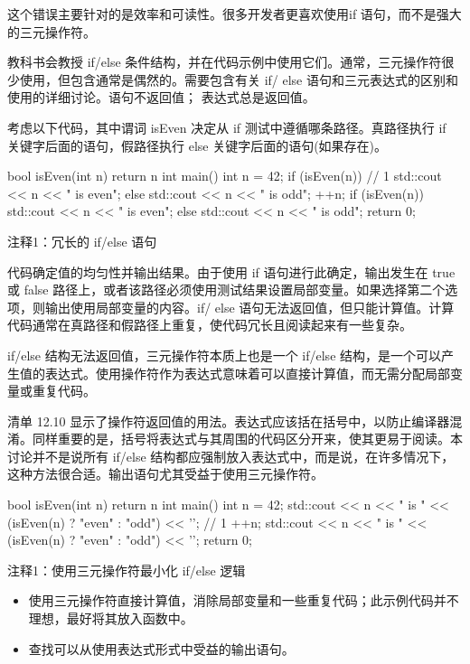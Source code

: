 这个错误主要针对的是效率和可读性。很多开发者更喜欢使用if 语句，而不是强大的三元操作符。


教科书会教授 if/else 条件结构，并在代码示例中使用它们。通常，三元操作符很少使用，但包含通常是偶然的。需要包含有关 if/ else 语句和三元表达式的区别和使用的详细讨论。语句不返回值； 表达式总是返回值。

考虑以下代码，其中谓词 isEven 决定从 if 测试中遵循哪条路径。真路径执行 if 关键字后面的语句，假路径执行 else 关键字后面的语句(如果存在)。


\begin{cpp}
bool isEven(int n) {
  return n %
}
int main() {
  int n = 42;
  if (isEven(n)) // 1
    std::cout << n << " is even\n";
  else
    std::cout << n << " is odd\n";
  ++n;
  if (isEven(n))
    std::cout << n << " is even\n";
  else
    std::cout << n << " is odd\n";
  return 0;
}
\end{cpp}

{\footnotesize
注释1：冗长的 if/else 语句
}


代码确定值的均匀性并输出结果。由于使用 if 语句进行此确定，输出发生在 true 或 false 路径上，或者该路径必须使用测试结果设置局部变量。如果选择第二个选项，则输出使用局部变量的内容。if/ else 语句无法返回值，但只能计算值。计算代码通常在真路径和假路径上重复，使代码冗长且阅读起来有一些复杂。


if/else 结构无法返回值，三元操作符本质上也是一个 if/else 结构，是一个可以产生值的表达式。使用操作符作为表达式意味着可以直接计算值，而无需分配局部变量或重复代码。

清单 12.10 显示了操作符返回值的用法。表达式应该括在括号中，以防止编译器混淆。同样重要的是，括号将表达式与其周围的代码区分开来，使其更易于阅读。本讨论并不是说所有 if/else 结构都应强制放入表达式中，而是说，在许多情况下，这种方法很合适。输出语句尤其受益于使用三元操作符。


\begin{cpp}
bool isEven(int n) {
  return n %
}
int main() {
  int n = 42;
  std::cout << n << " is " << (isEven(n) ? "even" : "odd") << '\n'; // 1
  ++n;
  std::cout << n << " is " << (isEven(n) ? "even" : "odd") << '\n';
  return 0;
}
\end{cpp}

{\footnotesize
注释1：使用三元操作符最小化 if/else 逻辑
}


\begin{itemize}
\item
使用三元操作符直接计算值，消除局部变量和一些重复代码；此示例代码并不理想，最好将其放入函数中。

\item
查找可以从使用表达式形式中受益的输出语句。
\end{itemize}
